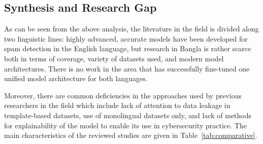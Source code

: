 \documentclass[journal]{IEEEtran}
\begin{document}
\subsection{Synthesis and Research Gap}

As can be seen from the above analysis, the literature in the field is
divided along two linguistic lines: highly advanced, accurate models
have been developed for spam detection in the English language, but
research in Bangla is rather scarce both in terms of coverage, variety
of datasets used, and modern model architectures. There is no work in
the area that has successfully fine-tuned one unified model architecture
for both languages.

Moreover, there are common deficiencies in the approaches used by
previous researchers in the field which include lack of attention to
data leakage in template-based datasets, use of monolingual datasets
only, and lack of methods for explainability of the model to enable its
use in cybersecurity practice. The main characteristics of the reviewed
studies are given in Table~\ref{tab:comparative}.
\end{document}
